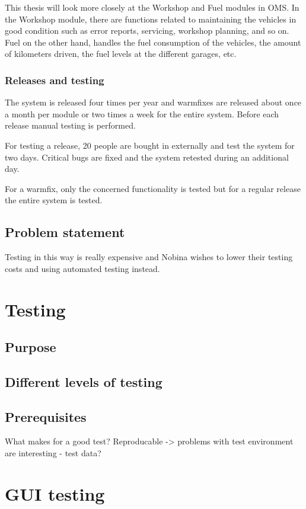 \documentclass{article}
\begin{document}
		This thesis will look more closely at the Workshop and Fuel modules in OMS. In the Workshop module, there are functions related to maintaining the vehicles in good condition such as error reports, servicing, workshop planning, and so on. Fuel on the other hand, handles the fuel consumption of the vehicles, the amount of kilometers driven, the fuel levels at the different garages, etc.

		\subsubsection{Releases and testing} 
		The system is released four times per year and warmfixes are released about once a month per module or two times a week for the entire system. Before each release manual testing is performed. 

		For testing a release, 20 people are bought in externally and test the system for two days. Critical bugs are fixed and the system retested during an additional day.
		
		For a warmfix, only the concerned functionality is tested but for a regular release the entire system is tested.

	\subsection{Problem statement}
		Testing in this way is really expensive and Nobina wishes to lower their testing costs and using automated testing instead. 

	\section{Testing}
		\subsection{Purpose}
		\subsection{Different levels of testing}
		\subsection{Prerequisites}
		What makes for a good test? Reproducable -> problems with test environment are interesting - test data?

	\section{GUI testing}
\end{document}
